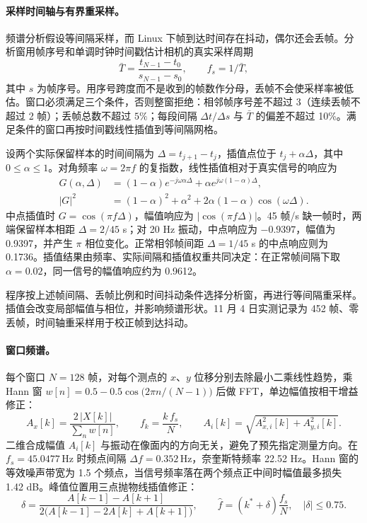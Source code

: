\paragraph{采样时间轴与有界重采样。}频谱分析假设等间隔采样，而 Linux 下帧到达时间存在抖动，偶尔还会丢帧。分析窗用帧序号和单调时钟时间戳估计相机的真实采样周期
\begin{equation}
\bar T=\frac{t_{N-1}-t_0}{s_{N-1}-s_0},\qquad f_s=1/\bar T ,
\end{equation}
其中 $s$ 为帧序号。用序号跨度而不是收到的帧数作分母，丢帧不会使采样率被低估。窗口必须满足三个条件，否则整窗拒绝：相邻帧序号差不超过 3（连续丢帧不超过 2 帧）；丢帧总数不超过 $5\%$；每段间隔 $\Delta t/\Delta s$ 与 $\bar T$ 的偏差不超过 10\%。满足条件的窗口再按时间戳线性插值到等间隔网格。

设两个实际保留样本的时间间隔为 $\Delta=t_{j+1}-t_j$，插值点位于 $t_j+\alpha\Delta$，其中 $0\le\alpha\le1$。对角频率 $\omega=2\pi f$ 的复指数，线性插值相对于真实信号的响应为
\begin{equation}
\begin{aligned}
G(\alpha,\Delta)&=(1-\alpha)e^{-j\omega\alpha\Delta}
+\alpha e^{j\omega(1-\alpha)\Delta},\\
|G|^2&=(1-\alpha)^2+\alpha^2+
2\alpha(1-\alpha)\cos(\omega\Delta).
\end{aligned}
\end{equation}
中点插值时 $G=\cos(\pi f\Delta)$，幅值响应为 $|\cos(\pi f\Delta)|$。45 帧/s 缺一帧时，两端保留样本相距 $\Delta=2/45$ s；对 20 Hz 振动，中点响应为 $-0.9397$，幅值为 0.9397，并产生 $\pi$ 相位变化。正常相邻帧间距 $\Delta=1/45$ s 的中点响应则为 0.1736。插值结果由频率、实际间隔和插值权重共同决定：在正常帧间隔下取 $\alpha=0.02$，同一信号的幅值响应约为 0.9612。

程序按上述帧间隔、丢帧比例和时间抖动条件选择分析窗，再进行等间隔重采样。插值会改变局部幅值与相位，并影响频谱形状。11 月 4 日实测记录为 452 帧、零丢帧，时间轴重采样用于校正帧到达抖动。

\paragraph{窗口频谱。}每个窗口 $N=128$ 帧，对每个测点的 $x$、$y$ 位移分别去除最小二乘线性趋势，乘 Hann 窗 $w[n]=0.5-0.5\cos\bigl(2\pi n/(N-1)\bigr)$ 后做 FFT，单边幅值按相干增益修正：
\begin{equation}
A_x[k]=\frac{2\,\lvert X[k]\rvert}{\sum_n w[n]},\qquad f_k=\frac{k\,f_s}{N},\qquad A_i[k]=\sqrt{A_{x,i}^2[k]+A_{y,i}^2[k]} .
\end{equation}
二维合成幅值 $A_i[k]$ 与振动在像面内的方向无关，避免了预先指定测量方向。在 $f_s=45.0477\,\mathrm{Hz}$ 时频点间隔 $\Delta f=0.352\,\mathrm{Hz}$，奈奎斯特频率 22.52 Hz。Hann 窗的等效噪声带宽为 1.5 个频点，当信号频率落在两个频点正中间时幅值最多损失 1.42 dB\cite{harris1978}。峰值位置用三点抛物线插值修正：
\begin{equation}
\delta=\frac{A[k-1]-A[k+1]}{2\bigl(A[k-1]-2A[k]+A[k+1]\bigr)},\qquad \hat f=(k^*+\delta)\frac{f_s}{N},\quad\lvert\delta\rvert\le0.75 .
\end{equation}

